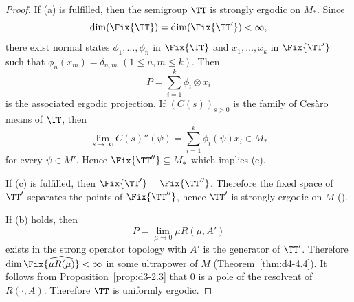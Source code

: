 \begin{proof}
If (a) is fulfilled, then the semigroup $ \TT $  is strongly ergodic on $ M_{*} $.
Since
\[
\dim (\Fix{\TT}) = \dim (\Fix{\TT'}) < \infty,
\]
there exist normal states $ \phi_{1},\ldots,\phi_{n} $  in $ \Fix{\TT} $  and $ x_{1},\ldots,x_{k} $  in $ \Fix{\TT'} $  such that $ \phi_{n}(x_{m}) = \delta_{n,m} $  $ (1 \leq n, m \leq k) $.
Then 
\[
P = \sum_{i=1}^{k} \phi_{i} \otimes x_{i} 
\]
is the associated ergodic projection.
If\/ $ (C(s))_{s>0} $  is the family of Cesàro means of\/ $ \TT $, then
\[
\lim_{s \to \infty} C(s)''(\psi) = \sum_{i=1}^{k} \phi_{i}(\psi)x_{i} \in M_{*}
\]
for every $ \psi \in M' $.
Hence $ \Fix{\TT''} \subseteq M_{*} $  which implies (c).

If (c) is fulfilled, then $ \Fix{\TT'} = \Fix{\TT''} $.
Therefore the fixed space of\/ $ \TT' $  separates the points of\/ $ \Fix{\TT''} $, hence $ \TT' $  is strongly ergodic on $ M $  (\textcite[Chap.2, Theorem~1.4]{krengel:1985}).

If (b) holds, then
\[
P = \lim_{\mu \to 0} \mu R(\mu,A')
\]
exists in the strong operator topology with $ A' $  is the generator of\/ $ \TT' $.
Therefore $ \dim \Fix{\widehat{\mu R(\mu)}} < \infty $  in some ultrapower of\/ $ M $  (Theorem~\ref{thm:d4-4.4}).
It follows from Proposition~\ref{prop:d3-2.3} that 0 is a pole of the resolvent of\/ $ R(\cdot,A) $.
Therefore $ \TT $  is uniformly ergodic.
\end{proof}
